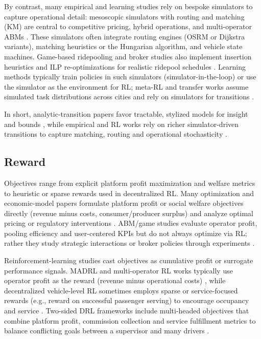 By contrast, many empirical and learning studies rely on bespoke simulators to capture operational detail: mesoscopic simulators with routing and matching (KM) are central to competitive pricing, hybrid operations, and multi-operator ABMs \citep{competitive_pricing,hybrid_operations,modeling_the_competition}. These simulators often integrate routing engines (OSRM or Dijkstra variants), matching heuristics or the Hungarian algorithm, and vehicle state machines. Game-based ridepooling and broker studies also implement insertion heuristics and ILP re-optimizations for realistic ridepool schedules \citep{competition_and_cooperation}. Learning methods typically train policies in such simulators (simulator-in-the-loop) or use the simulator as the environment for RL; meta-RL and transfer works assume simulated task distributions across cities and rely on simulators for transitions \citep{graph_meta,learning_based}.

In short, analytic-transition papers favor tractable, stylized models for insight and bounds \citep{geometric_matching,spatiotemporal_pricing,spatial_pricing}, while empirical and RL works rely on richer simulator-driven transitions to capture matching, routing and operational stochasticity \citep{competitive_pricing,hybrid_operations,modeling_the_competition,competition_and_cooperation,graph_meta}.

\subsection{Reward}
Objectives range from explicit platform profit maximization and welfare metrics to heuristic or sparse rewards used in decentralized RL. Many optimization and economic-model papers formulate platform profit or social welfare objectives directly (revenue minus costs, consumer/producer surplus) and analyze optimal pricing or regulatory interventions \citep{spatiotemporal_pricing,geometric_matching,spatial_pricing}. ABM/game studies evaluate operator profit, pooling efficiency and user-centered KPIs but do not always optimize via RL; rather they study strategic interactions or broker policies through experiments \citep{competition_and_cooperation,modeling_the_competition}.

Reinforcement-learning studies cast objectives as cumulative profit or surrogate performance signals. MADRL and multi-operator RL works typically use operator profit as the reward (revenue minus operational costs) \citep{competitive_pricing,learning_based,graph_meta}, while decentralized vehicle-level RL sometimes employs sparse or service-focused rewards (e.g., reward on successful passenger serving) to encourage occupancy and service \citep{samod}. Two-sided DRL frameworks include multi-headed objectives that combine platform profit, commission collection and service fulfillment metrics to balance conflicting goals between a supervisor and many drivers \citep{two_sided}.

